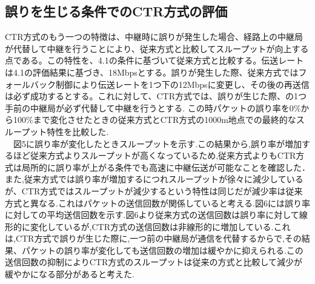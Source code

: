 \documentclass[a4paper,10pt]{ltjsarticle}
\begin{document}
\subsection{誤りを生じる条件でのCTR方式の評価}%
CTR方式のもう一つの特徴は、中継時に誤りが発生した場合、経路上の中継局が代替して中継を行うことにより、従来方式と比較してスループットが向上する点である。この特性を、4.1の条件に基づいて従来方式と比較する。伝送レートは4.1の評価結果に基づき、18Mbpsとする。誤りが発生した際、従来方式ではフォールバック制御により伝送レートを1つ下の12Mbpsに変更し、その後の再送信は必ず成功するとする。これに対して、CTR方式では、誤りが生じた際、の1つ手前の中継局が必ず代替して中継を行うとする.
この時パケットの誤り率を0\%から100\%まで変化させたときの従来方式とCTR方式の1000m地点での最終的なスループット特性を比較した.
\\　図5に誤り率が変化したときスループットを示す.この結果から,誤り率が増加するほど従来方式よりスループットが高くなっているため,従来方式よりもCTR方式は局所的に誤り率が上がる条件でも高速に中継伝送が可能なことを確認した．
また,従来方式では誤り率が増加するにつれスループットが徐々に減少しているが、CTR方式ではスループットが減少するという特性は同じだが減少率は従来方式と異なる.これはパケットの送信回数が関係していると考える.図6には誤り率に対しての平均送信回数を示す.図6より従来方式の送信回数は誤り率に対して線形的に変化しているが,CTR方式の送信回数は非線形的に増加している.これは,CTR方式で誤りが生じた際に,一つ前の中継局が通信を代替するからで,その結果、パケットの誤り率が変化しても送信回数の増加は緩やかに抑えられる.この送信回数の抑制によりCTR方式のスループットは従来の方式と比較して減少が緩やかになる部分があると考えた. 
\end{document}

